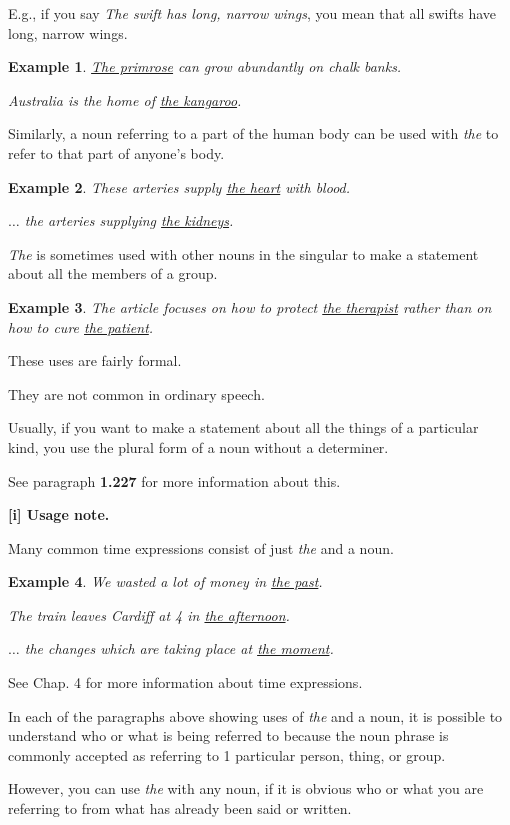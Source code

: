 \documentclass[oneside]{book}
\numberwithin{equation}{section}
\newtheorem{example}{Example}[section]
\begin{document}
E.g., if you say \textit{The swift has long, narrow wings}, you mean that all swifts have long, narrow wings.
\begin{example}
    \underline{The primrose} can grow abundantly on chalk banks.
    
    Australia is the home of \underline{the kangaroo}.
\end{example}
Similarly, a noun referring to a part of the human body can be used with \textit{the} to refer to that part of anyone's body.
\begin{example}
    These arteries supply \underline{the heart} with blood.
    
    $\ldots$ the arteries supplying \underline{the kidneys}.
\end{example}
\textit{The} is sometimes used with other nouns in the singular to make a statement about all the members of a group.
\begin{example}
    The article focuses on how to protect \underline{the therapist} rather than on how to cure \underline{the patient}.
\end{example}
These uses are fairly formal.

They are not common in ordinary speech.

Usually, if you want to make a statement about all the things of a particular kind, you use the plural form of a noun without a determiner.

See paragraph \textbf{1.227} for more information about this.

\textbf{[i] Usage note.}

%
\noindent{} Many common time expressions consist of just \textit{the} and a noun.
\begin{example}
    We wasted a lot of money in \underline{the past}.
    
    The train leaves Cardiff at 4 in \underline{the afternoon}.
    
    $\ldots$ the changes which are taking place at \underline{the moment}.
\end{example}
See Chap. 4 for more information about time expressions.

%
\noindent{} In each of the paragraphs above showing uses of \textit{the} and a noun, it is possible to understand who or what is being referred to because the noun phrase is commonly accepted as referring to 1 particular person, thing, or group.

%
However, you can use \textit{the} with any noun, if it is obvious who or what you are referring to from what has already been said or written.
\end{document}
